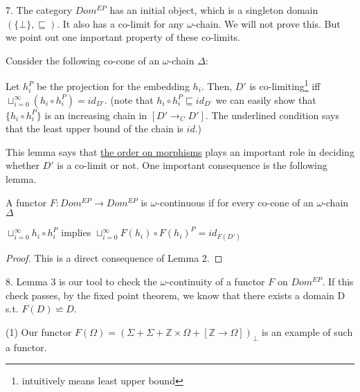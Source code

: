 \documentclass{report}[12pt]
\begin{document}
7. The category $Dom^{EP}$ has an initial object, which is a singleton domain $(\{\bot\}, \sqsubseteq)$. It also has a co-limit for any $\omega$-chain. We will not prove this. But we point out one important property of these co-limits.

\begin{lemma}
  Consider the following co-cone of an $\omega$-chain $\Delta$:
  {\center
  \par}
  Let $h_i^P$ be the projection for the embedding $h_i$. Then, $D'$ is co-limiting\footnote{intuitively means least upper bound} iff \underline{$\sqcup_{i=0}^\infty (h_i \circ h_i^P) = id_{D'}$}.
  (note that $h_i \circ h_i^P \sqsubseteq id_{D'}$ we can easily show that $\{h_i \circ h_i^P\}$ is an increasing chain in $[D'\rightarrow_C D']$. The underlined condition says that the least upper bound of the chain is $id$.)
\end{lemma}
This lemma says that \underline{the order on morphisms} plays an important role in deciding whether $D'$ is a co-limit or not. One important consequence is the following lemma.
\begin{lemma}
  A functor $F:Dom^{EP}\rightarrow Dom^{EP}$ is $\omega$-continuous if for every co-cone of an $\omega$-chain $\Delta$
  {\center
  \par}
  $\sqcup_{i=0}^\infty h_i \circ h_i^P$ implies $\sqcup_{i=0}^\infty F(h_i) \circ F(h_i)^P = id_{F(D')}$
\end{lemma}
\begin{proof}
  This is a direct consequence of Lemma 2.
\end{proof}

8. Lemma 3 is our tool to check the $\omega$-continuity of a functor $F$ on $Dom^{EP}$. If this check passes, by the fixed point theorem, we know that there exists a domain D s.t. $F(D)\backsimeq D$.

(1) Our functor $F(\Omega) = (\Sigma + \Sigma + \mathbb{Z}\times \Omega + [\mathbb{Z}\rightarrow \Omega])_\bot$ is an example of such a functor.
\end{document}
